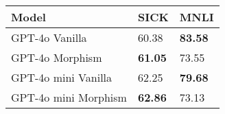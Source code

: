 \begin{tabularx}{1.2\linewidth}{l*{2}{Z}}
\hline
\textbf{Model} & \textbf{SICK}& \textbf{MNLI} \\
\hline
GPT-4o Vanilla  & 60.38 & \textbf{83.58} \\
GPT-4o Morphism & \textbf{61.05} & 73.55 \\
\hline
GPT-4o mini Vanilla & 62.25 & \textbf{79.68}   \\
GPT-4o mini Morphism &  \textbf{62.86} & 73.13   \\
\hline
\end{tabularx}